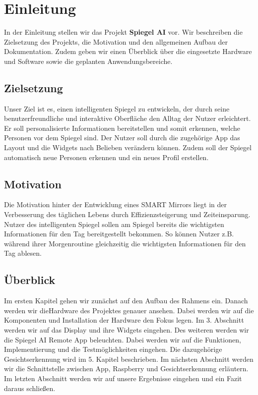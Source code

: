 \chapter*{Einleitung}

In der Einleitung stellen wir das Projekt \textbf{Spiegel AI} vor. Wir beschreiben die Zielsetzung des Projekts, die Motivation und den allgemeinen Aufbau der Dokumentation. Zudem geben wir einen Überblick über die eingesetzte Hardware und Software sowie die geplanten Anwendungsbereiche.

\section*{Zielsetzung}
Unser Ziel ist es, einen intelligenten Spiegel zu entwickeln, der durch seine benutzerfreundliche und interaktive Oberfläche den Alltag der Nutzer erleichtert. Er soll personalisierte Informationen bereitstellen und somit erkennen, welche Personen vor dem Spiegel sind. Der Nutzer soll durch die zugehörige App das Layout und die Widgets nach Belieben verändern können. Zudem soll der Spiegel automatisch neue Personen erkennen und ein neues Profil erstellen.

\section*{Motivation}
Die Motivation hinter der Entwicklung eines SMART Mirrors liegt in der Verbesserung des täglichen Lebens durch Effizienzsteigerung und Zeiteinsparung. Nutzer des intelligenten Spiegel sollen am Spiegel bereits die wichtigsten Informationen für den Tag bereitgestellt bekommen. So können Nutzer z.B. während ihrer Morgenroutine gleichzeitig die wichtigsten Informationen für den Tag ablesen.

\section*{Überblick}
Im ersten Kapitel gehen wir zunächst auf den Aufbau des Rahmens ein. Danach werden wir dieHardware des Projektes genauer ansehen. Dabei werden wir auf die Komponenten und Installation der Hardware den Fokus legen. Im 3. Abschnitt werden wir auf das Display und ihre Widgets eingehen. Des weiteren werden wir die Spiegel AI Remote App beleuchten. Dabei werden wir auf die Funktionen, Implementierung und die Testmöglichkeiten eingehen. Die dazugehörige Gesichtserkennung wird im 5. Kapitel beschrieben. Im nächsten Abschnitt werden wir die Schnittstelle zwischen App, Raspberry und Gesichtserkennung erläutern. Im letzten Abschnitt werden wir auf unsere Ergebnisse eingehen und ein Fazit daraus schließen. 
